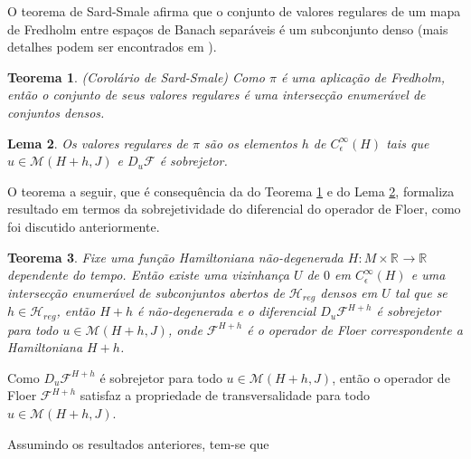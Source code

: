\documentclass[12pt]{book}
\newtheorem{teorema}{Teorema}[section]
\newtheorem{lema}[teorema]{Lema}
\newcommand{\diferencialfloerponto}[1]{D_{#1}\operadorFloer}
\newcommand{\energiafinitaM}{\mathcal{M}}
\newcommand{\energiafinitaMHamiltoniana}[1]{\energiafinitaM(#1, J)}
\newcommand{\hamiltonianasRegulares}{\mathcal{H}_{reg}}
\newcommand{\operadorFloer}{\mathcal{F}}
\newcommand{\paresregulares}{\mathcal{H}_{reg}}
\newcommand{\perturbacaoHamiltoniana}[1]{C^{\infty}_{\epsilon}(#1)}
\newcommand{\real}[1]{\mathbb{R}^{#1}}
\newcommand{\reta}{\real{}}
\begin{document}
	O teorema de Sard-Smale afirma que o conjunto de valores regulares de um mapa de Fredholm entre espaços de Banach separáveis é um subconjunto denso (mais detalhes podem ser encontrados em \cite{audi_floer_homology}).
	
	\begin{teorema}\label{teorema_sard_smale}
		(Corolário de Sard-Smale) Como $\pi$ é uma aplicação de Fredholm, então o conjunto de seus valores regulares é uma intersecção enumerável de conjuntos densos.
	\end{teorema}
	
	\begin{lema}\label{lema_valores_regular_pi}
		Os valores regulares de $\pi$ são os elementos $h$ de $\perturbacaoHamiltoniana{H}$ tais que $u\in \energiafinitaM(H+h, J)$ e $\diferencialfloerponto{u}$ é sobrejetor.
	\end{lema}

	O teorema a seguir, que é consequência da do Teorema \ref{teorema_sard_smale} e do Lema \ref{lema_valores_regular_pi}, formaliza resultado em termos da sobrejetividade do diferencial do operador de Floer, como foi discutido anteriormente.
	
	\begin{teorema}\label{teorema_sobrejetividade_DF_todo_u}
		Fixe uma função Hamiltoniana não-degenerada $H:M\times \reta\to \reta$ dependente do tempo. Então existe uma vizinhança $U$ de $0$ em $\perturbacaoHamiltoniana{H}$ e uma intersecção enumerável de subconjuntos abertos de $\hamiltonianasRegulares$ densos em $U$ tal que se $h\in \paresregulares$, então $H+h$ é não-degenerada e o diferencial $\diferencialfloerponto{u}^{H+h}$ é sobrejetor para todo $u \in \energiafinitaMHamiltoniana{H+h}$, onde $\operadorFloer^{H+h}$ é o operador de Floer correspondente a Hamiltoniana $H+h$.
	\end{teorema}
	
	Como $\diferencialfloerponto{u}^{H+h}$ é sobrejetor para todo $u \in \energiafinitaMHamiltoniana{H+h}$, então o operador de Floer $\operadorFloer^{H+h}$ satisfaz a propriedade de transversalidade para todo $u \in \energiafinitaMHamiltoniana{H+h}$.

	Assumindo os resultados anteriores, tem-se que 
	
\end{document}
